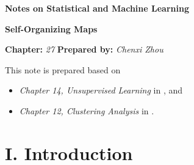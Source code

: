 \documentclass[12pt]{article}
\newcommand{\titlebox}[4]{
\begin{tcolorbox}[colback = blue!5!white!95, colframe = blue!70!black
]
  \noindent \textbf{ #1 } \hfill \textit{#2} 
  \begin{center}
  	 \LARGE{\textbf{#3}}
  \end{center}
\textbf{Chapter:} \textit{#4} \hfill \textbf{Prepared by:} \textit{Chenxi Zhou}
\end{tcolorbox}
}
\begin{document}
\titlebox{Notes on Statistical and Machine Learning}{}{Self-Organizing Maps}{27}
\thispagestyle{plain}

\vspace{10pt}

This note is prepared based on 
\begin{itemize}
	\item \textit{Chapter 14, Unsupervised Learning} in \textcite{Friedman2001-np}, and 
	\item \textit{Chapter 12, Clustering Analysis} in \textcite{Izenman2009-jk}. 
\end{itemize}


\section*{I. Introduction}
\end{document}

